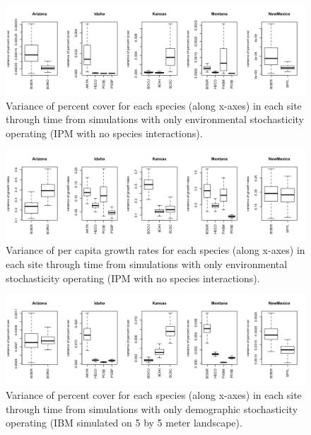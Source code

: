 \documentclass[12pt,]{article}
\begin{document}
\pagebreak{}

\begin{figure}[!ht]
  \centering
      \includegraphics[width=6in]{./components/formatted_figures/environmental_variances_cover.png}
  \caption{Variance of percent cover for each species (along x-axes) in each site through time from simulations with only environmental stochasticity operating (IPM with no species interactions).}
\end{figure}

\begin{figure}[!ht]
  \centering
      \includegraphics[width=6in]{./components/formatted_figures/environmental_variances_pgr.png}
  \caption{Variance of per capita growth rates for each species (along x-axes) in each site through time from simulations with only environmental stochasticity operating (IPM with no species interactions).}
\end{figure}

\newpage{}

\begin{figure}[!ht]
  \centering
      \includegraphics[width=6in]{./components/formatted_figures/demographic_variances_cover.png}
  \caption{Variance of percent cover for each species (along x-axes) in each site through time from simulations with only demographic stochasticity operating (IBM simulated on 5 by 5 meter landscape).}
\end{figure}
\end{document}

